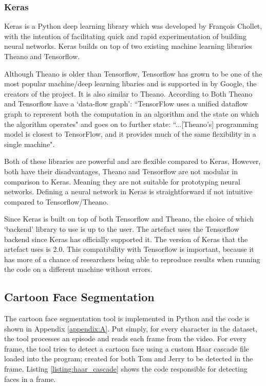 \documentclass[report, 11pt, oneside]{dissertation}
\begin{document}
\subsubsection{Keras}

Keras is a Python deep learning library which was developed by Fran\c{c}ois Chollet, with the intention of facilitating quick and rapid experimentation of building neural networks. Keras builds on top of two existing machine learning libraries Theano and Tensorflow.

Although Theano is older than Tensorflow, Tensorflow has grown to be one of the most popular machine/deep learning libaries and is supported in by Google, the creators of the project. It is also similar to Theano. According to \citep{Abadi:2016vn}  Both Theano and Tensorflow have a `data-flow graph': ``TensorFlow uses a unified dataflow graph to represent both the computation in an algorithm and the state on which the algorithm operates"  \citep[1]{Abadi:2016vn} and goes on to further state: ``...[Theano's] programming model is closest to TensorFlow, and it provides much of the same flexibility in a single machine"\citep[2]{Abadi:2016vn}.

Both of these libraries are powerful and are flexible compared to Keras, However, both have their disadvantages, Theano and Tensorflow are not modular in comparison to Keras. Meaning they are not suitable for prototyping neural networks. Defining a neural network in Keras is straightforward if not intuitive compared to Tensorflow/Theano.

Since Keras is built on top of both Tensorflow and Theano, the choice of which `backend' library to use is up to the user. The artefact uses the Tensorflow backend since Keras has officially supported it. The version of Keras that the artefact uses is 2.0. This compatibility with Tensorflow is important, because it has more of a chance of researchers being able to reproduce results when running the code on a different machine without errors.

\subsection{Cartoon Face Segmentation}
The cartoon face segmentation tool is implemented in Python and the code is shown in Appendix \ref{appendix:A}. Put simply, for every character in the dataset, the tool processes an episode and reads each frame from the video. For every frame, the tool tries to detect a cartoon face using a custom Haar cascade file loaded into the program; created for both Tom and Jerry to be detected in the frame. Listing \ref{listing:haar_cascade} shows the code responsible for detecting faces in a frame.
\end{document}
